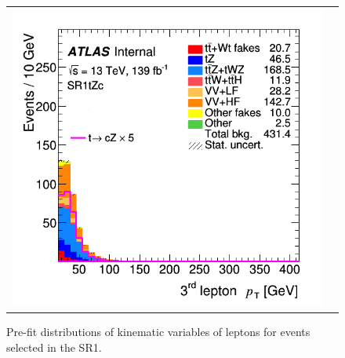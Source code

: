 \begin{figure}[!htbp]
\begin{tabular}{cc}
		\includegraphics[width=.35\textwidth]{Appendices/AP5/figures/SR1/lep3_pt} \\
	\end{tabular}
	\caption{Pre-fit distributions of kinematic variables of leptons for events selected in the SR1\tZc.
		\ErrStatOnly
		\Blinded
	}%
	\label{fig:sel:sr1:leps}
\end{figure}

